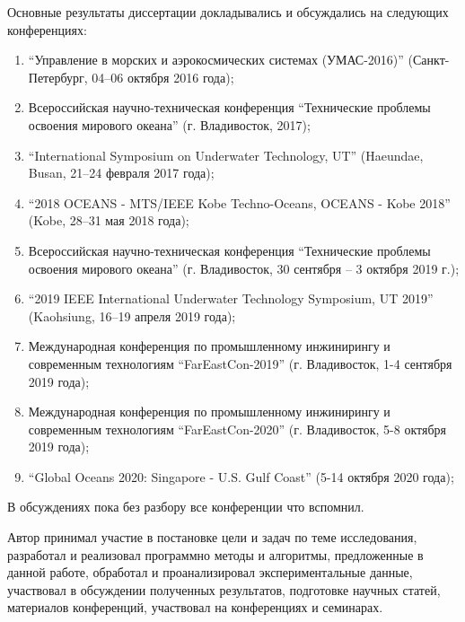 {\probation}
Основные результаты диссертации
докладывались и обсуждались на следующих конференциях:
\begin{enumerate}
    \item ``Управление в морских и аэрокосмических системах (УМАС-2016)'' (Санкт-Петербург, 04–06 октября 2016 года);
    \item Всероссийская научно-техническая конференция ``Технические проблемы освоения мирового океана'' (г. Владивосток, 2017);
    \item ``International Symposium on Underwater Technology, UT'' (Haeundae, Busan, 21–24 февраля 2017 года);
    \item ``2018 OCEANS - MTS/IEEE Kobe Techno-Oceans, OCEANS - Kobe 2018'' (Kobe, 28–31 мая 2018 года);
    \item Всероссийская научно-техническая конференция ``Технические проблемы освоения мирового океана'' (г. Владивосток, 30 сентября – 3 октября 2019 г.);
    \item ``2019 IEEE International Underwater Technology Symposium, UT 2019'' (Kaohsiung, 16–19 апреля 2019 года);
    \item Международная конференция по промышленному инжинирингу и современным технологиям ``FarEastCon-2019'' (г. Владивосток, 1-4 сентября 2019 года);
    \item Международная конференция по промышленному инжинирингу и современным технологиям ``FarEastCon-2020'' (г. Владивосток, 5-8 октября 2019 года);
    \item ``Global Oceans 2020: Singapore - U.S. Gulf Coast'' (5-14 октября 2020 года);
\end{enumerate}
\begin{noteplan}
    В обсуждениях пока без разбору все конференции что вспомнил.
\end{noteplan}

{\contribution} Автор принимал участие в постановке цели и задач по теме исследования, разработал и реализовал программно методы и алгоритмы, предложенные в данной работе, обработал и проанализировал экспериментальные данные, участвовал в обсуждении полученных результатов, подготовке научных статей, материалов конференций, участвовал на конференциях и семинарах.


